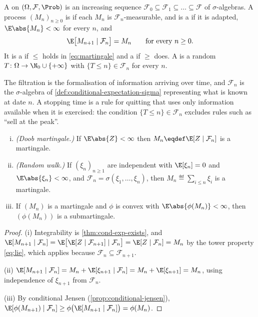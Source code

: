 \begin{definition}\label{def:martingale}
	A  on $(\Omega,\mathcal{F},\Prob)$ is an
	increasing sequence $\mathcal{F}_0\subseteq\mathcal{F}_1\subseteq\dots
		\subseteq\mathcal{F}$ of $\sigma$-algebras. A process $(M_n)_{n\geq0}$ is
	 if each $M_n$ is $\mathcal{F}_n$-measurable,
	and is a  if it is adapted, $\E\abs{M_n}<\infty$
	for every $n$, and
	\begin{equation}\label{eq:martingale}
		\E\bigl[M_{n+1}\mid\mathcal{F}_n\bigr]=M_n\qquad\text{for every }n\geq0 .
	\end{equation}
	It is a  if $\leq$ holds in
	\eqref{eq:martingale} and a  if $\geq$
	does. A  is a random
	$T\colon\Omega\to\N_0\cup\{+\infty\}$ with $\{T\leq n\}\in\mathcal{F}_n$ for
	every $n$.
\end{definition}

The filtration is the formalisation of information arriving over time, and
$\mathcal{F}_n$ is the $\sigma$-algebra of \autoref{def:conditional-expectation-sigma}
representing what is known at date $n$. A stopping time is a rule for quitting
that uses only information available when it is exercised: the condition
$\{T\leq n\}\in\mathcal{F}_n$ excludes rules such as ``sell at the peak''.

\begin{proposition}\label{prop:martingale-examples}
	\begin{enumerate}[(i)]
		\item \emph{(Doob martingale.)} If $\E\abs{Z}<\infty$ then
		      $M_n\eqdef\E[Z\mid\mathcal{F}_n]$ is a martingale.
		\item \emph{(Random walk.)} If $(\xi_n)_{n\geq1}$ are independent with
		      $\E[\xi_n]=0$ and $\E\abs{\xi_n}<\infty$, and
		      $\mathcal{F}_n=\sigma(\xi_1,\dots,\xi_n)$, then
		      $M_n\eqdef\sum_{i\leq n}\xi_i$ is a martingale.
		\item If $(M_n)$ is a martingale and $\phi$ is convex with
		      $\E\abs{\phi(M_n)}<\infty$, then $(\phi(M_n))$ is a submartingale.
	\end{enumerate}
\end{proposition}

\begin{proof}
	(i) Integrability is \autoref{thm:cond-exp-exists}, and
	$\E[M_{n+1}\mid\mathcal{F}_n]=\E\bigl[\E[Z\mid\mathcal{F}_{n+1}]
		\mid\mathcal{F}_n\bigr]=\E[Z\mid\mathcal{F}_n]=M_n$ by the tower property
	\eqref{eq:lie}, which applies because $\mathcal{F}_n\subseteq\mathcal{F}_{n+1}$.

	(ii) $\E[M_{n+1}\mid\mathcal{F}_n]=M_n+\E[\xi_{n+1}\mid\mathcal{F}_n]
		=M_n+\E[\xi_{n+1}]=M_n$, using independence of $\xi_{n+1}$ from
	$\mathcal{F}_n$.

	(iii) By conditional Jensen (\autoref{prop:conditional-jensen}),
	$\E[\phi(M_{n+1})\mid\mathcal{F}_n]\geq\phi\bigl(\E[M_{n+1}\mid\mathcal{F}_n]\bigr)
		=\phi(M_n)$.
\end{proof}

